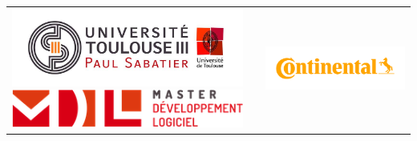 \begin{titlepage}
\BgThispage
{}
\begin{tabular}{cp{1.8cm}c}
	\begin{minipage}{0.4\textwidth}
		\vspace{-60px}
		\hspace{-35px}
		\includegraphics[width=8cm]{styles/images/logos/ups.jpg}
		\includegraphics[width=8cm]{styles/images/logos/mdl.png}
	\end{minipage}
	&
	&
	\begin{minipage}{0.4\textwidth}
		\vspace{-40px}
		\includegraphics[height=3cm]{styles/images/logos/conti.png}
	\end{minipage}
	\\
\end{tabular}


\end{titlepage}
